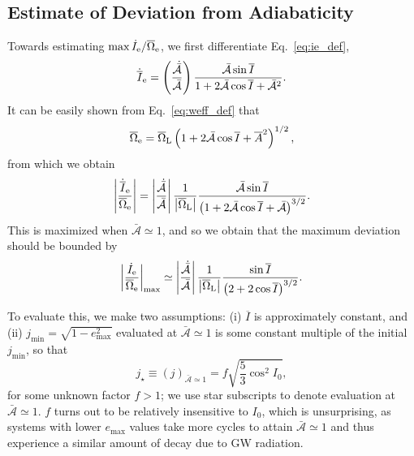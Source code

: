 \documentclass[
        fleqn,
        usenatbib,
    ]{mnras}
\newcommand*{\abs}[1]{\left|#1\right|}
\newcommand*{\p}[1]{\left(#1\right)}
\begin{document}
\subsection{Estimate of Deviation from Adiabaticity}

Towards estimating $\max \dot{I}_{\rm e} / \overline{\Omega}_{\rm e}$, we first
differentiate Eq.~\eqref{eq:ie_def},
\begin{equation}
    \dot{\overline{I}}_{\rm e} = \p{\frac{\dot{\bar{\mathcal{A}}}}{
            \bar{\mathcal{A}}}}
        \frac{\bar{\mathcal{A}} \sin \overline{I}}{
            1 + 2\bar{\mathcal{A}}\cos \overline{I}
                + \bar{\mathcal{A}}^2}.
\end{equation}
It can be easily shown from Eq.~\eqref{eq:weff_def} that
\begin{equation}
    \overline{\Omega}_{\rm e} = \overline{\Omega}_{\rm L}
        \p{1 + 2\bar{\mathcal{A}}\cos \overline{I}
            + \overline{A}^2}^{1/2},
\end{equation}
from which we obtain
\begin{equation}
    \abs{\frac{\dot{\overline{I}}_{\rm e}}{\overline{\Omega}_{\rm e}}}
        = \abs{\frac{\dot{\bar{\mathcal{A}}}}{
            \bar{\mathcal{A}}}}
        \frac{1}{\abs{\overline{\Omega}_{\rm L}}}
        \frac{\bar{\mathcal{A}} \sin \overline{I}}{
            \p{1 + 2\bar{\mathcal{A}}\cos \overline{I}
                + \bar{\mathcal{A}}}^{3/2}}.
\end{equation}
This is maximized when $\bar{\mathcal{A}} \simeq 1$, and so we obtain that
the maximum deviation should be bounded by
\begin{equation}
    \abs{\frac{\dot{I}_{\rm e}}{\overline{\Omega}_{\rm e}}}_{\max}
        \simeq \abs{\frac{\dot{\bar{\mathcal{A}}}}{\bar{\mathcal{A}}}}
            \frac{1}{\abs{\overline{\Omega}_{\rm L}}}
            \frac{\sin \overline{I}}{\p{2 + 2\cos \overline{I}}^{3/2}}.
            \label{eq:idot_over_W}
\end{equation}

To evaluate this, we make two assumptions: (i) $\overline{I}$ is approximately
constant, and (ii) $j_{\min} = \sqrt{1 - e_{\max}^2}$ evaluated at
$\bar{\mathcal{A}} \simeq 1$ is some constant multiple of the initial
$j_{\min}$, so that
\begin{equation}
    j_{\star} \equiv (j)_{\bar{\mathcal{A}} \simeq 1} = f
        \sqrt{\frac{5}{3}\cos^2 I_0},\label{eq:jstar_ansatz}
\end{equation}
for some unknown factor $f > 1$; we use star subscripts to denote evaluation at
$\bar{\mathcal{A}} \simeq 1$. $f$ turns out to be relatively insensitive to
$I_0$, which is unsurprising, as systems with lower $e_{\max}$ values take more
cycles to attain $\bar{\mathcal{A}} \simeq 1$ and thus experience a similar
amount of decay due to GW radiation.
\end{document}
